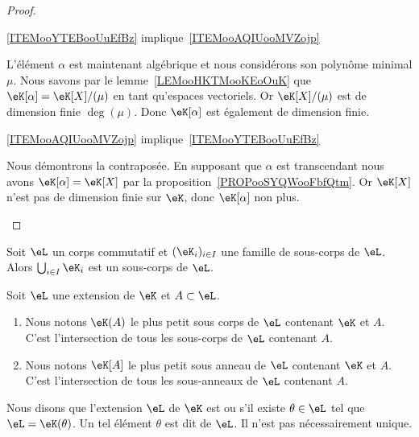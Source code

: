\begin{proof}
\begin{subproof}
        \item[\ref{ITEMooYTEBooUuEfBz} implique~\ref{ITEMooAQIUooMVZojp}]

            L'élément \( \alpha\) est maintenant algébrique et nous considérons son polynôme minimal \( \mu\). Nous savons par le lemme~\ref{LEMooHKTMooKEoOuK} que \( \eK[\alpha]=\eK[X]/(\mu)\) en tant qu'espaces vectoriels. Or \( \eK[X]/(\mu)\) est de dimension finie \( \deg(\mu)\). Donc \( \eK[\alpha]\) est également de dimension finie.

        \item[\ref{ITEMooAQIUooMVZojp} implique~\ref{ITEMooYTEBooUuEfBz}]

            Nous démontrons la contraposée. En supposant que \( \alpha\) est transcendant nous avons \( \eK[\alpha]=\eK[X]\) par la proposition~\ref{PROPooSYQWooFbfQtm}. Or \( \eK[X]\) n'est pas de dimension finie sur \( \eK\), donc \( \eK[\alpha]\) non plus.

    \end{subproof}
\end{proof}

\begin{lemma}
    Soit \( \eL\) un corps commutatif et \( (\eK_i)_{i\in I}\) une famille de sous-corps de \( \eL\). Alors \( \bigcup_{i\in I}\eK_i\) est un sous-corps de \( \eL\).
\end{lemma}

\begin{definition}  \label{DefZCYIbve}
    Soit \( \eL\) une extension de \( \eK\) et \( A\subset \eL\).
    \begin{enumerate}
        \item

    Nous notons \( \eK(A)\) le plus petit sous corps de \( \eL\) contenant \( \eK\) et \( A\). C'est l'intersection de tous les sous-corps de \( \eL\) contenant \( A\).
\item
    Nous notons \( \eK[A]\) le plus petit sous anneau de \( \eL\) contenant \( \eK\) et \( A\). C'est l'intersection de tous les sous-anneaux de \( \eL\) contenant \( A\).
    \end{enumerate}
    Nous disons que l'extension \( \eL\) de \( \eK\) est  ou  s'il existe \( \theta\in\eL\) tel que \( \eL=\eK(\theta)\). Un tel élément \( \theta\) est dit  de \( \eL\). Il n'est pas nécessairement unique.
\end{definition}

